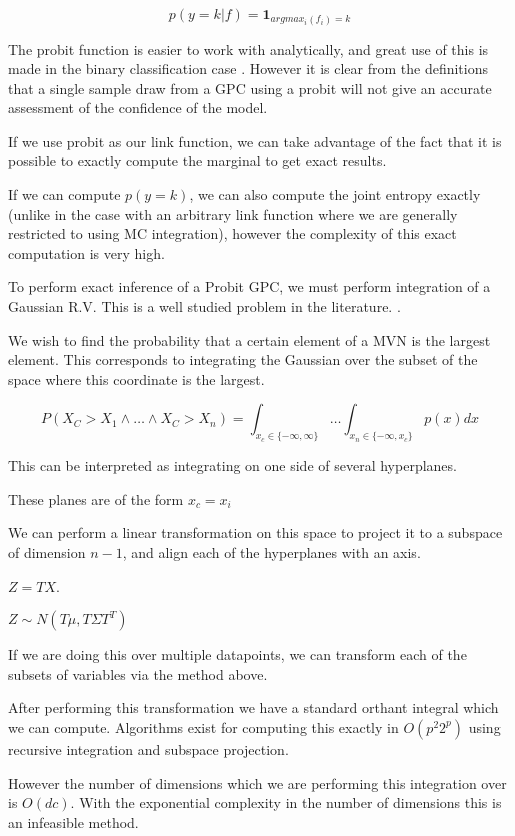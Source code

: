 \documentclass[12pt, a4paper]{report}
\theoremstyle{definition}
\theoremstyle{definition}
\theoremstyle{definition}
\begin{document}
$$p\left(y = k | f\right) = \mathbf{1}_{argmax_i(f_i) = k}$$


The probit function is easier to work with analytically, and great use of this is made in the binary classification case \cite{houlsby2011bayesian}. However it is clear from the definitions that a single sample draw from a GPC using a probit will not give an accurate assessment of the confidence of the model.


\label{sec:Integration}

If we use probit as our link function, we can take advantage of the fact that it is possible to exactly compute the marginal to get exact results.

If we can compute $p(y=k)$, we can also compute the joint entropy exactly (unlike in the case with an arbitrary link function where we are generally restricted to using MC integration), however the complexity of this exact computation is very high.


To perform exact inference of a Probit GPC, we must perform integration of a Gaussian R.V. This is a well studied problem in the literature. \cite{orthant1}.


We wish to find the probability that a certain element of a MVN is the largest element. This corresponds to integrating the Gaussian over the subset of the space where this coordinate is the largest.

$$P(X_C > X_1 \land \ldots \land X_C > X_n) = \int_{x_c \in \{ -\infty, \infty \} } \ldots \int_{x_n \in \{ -\infty , x_c \}} p(x) dx$$

This can be interpreted as integrating on one side of several hyperplanes.

These planes are of the form $x_c = x_i$

We can perform a linear transformation on this space to project it to a subspace of dimension $n-1$, and align each of the hyperplanes with an axis.

$Z = TX$.

$Z \sim N(T \mu, T \Sigma T^T)$


If we are doing this over multiple datapoints, we can transform each of the subsets of variables via the method above.

After performing this transformation we have a standard orthant integral which we can compute. Algorithms exist for computing this exactly in $O(p^2 2^p)$ using recursive integration and subspace projection. \cite{orthant}


However the number of dimensions which we are performing this integration over is $O(dc)$. With the exponential complexity in the number of dimensions this is an infeasible method.
\end{document}

